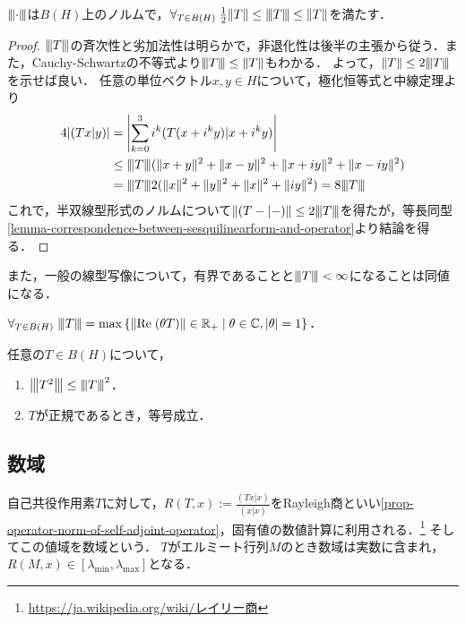 \documentclass[uplatex,dvipdfmx]{jsreport}
\begin{document}
\begin{proposition}[数域半径は同値なノルムを定める]
    $\nnorm{\cdot}$は$B(H)$上のノルムで，$\forall_{T\in B(H)}\;\frac{1}{2}\norm{T}\le\nnorm{T}\le\norm{T}$を満たす．
\end{proposition}
\begin{proof}
    $\nnorm{T}$の斉次性と劣加法性は明らかで，非退化性は後半の主張から従う．また，Cauchy-Schwartzの不等式より$\nnorm{T}\le\norm{T}$もわかる．
    よって，$\norm{T}\le 2\nnorm{T}$を示せば良い．
    任意の単位ベクトル$x,y\in H$について，極化恒等式と中線定理より
    \begin{align*}
        4\abs{(Tx|y)}&=\Abs{\sum^3_{k=0}i^k(T(x+i^ky)|x+i^ky)}\\
        &\le\nnorm{T}(\norm{x+y}^2+\norm{x-y}^2+\norm{x+iy}^2+\norm{x-iy}^2)\\
        &=\nnorm{T}2(\norm{x}^2+\norm{y}^2+\norm{x}^2+\norm{iy}^2)=8\nnorm{T}
    \end{align*}
    これで，半双線型形式のノルムについて$\norm{(T-|-)}\le2\nnorm{T}$を得たが，等長同型\ref{lemma-correspondence-between-sesquilinearform-and-operator}より結論を得る．
\end{proof}
\begin{remarks}
    また，一般の線型写像について，有界であることと$\nnorm{T}<\infty$になることは同値になる．
\end{remarks}

\begin{proposition}
    $\forall_{T\in B(H)}\;\nnorm{T}=\max\Brace{\norm{\Re(\theta T)}\in\R_+\mid\theta\in\C,\abs{\theta}=1}$．
\end{proposition}

\begin{proposition}
    任意の$T\in B(H)$について，
    \begin{enumerate}
        \item $\nnorm{T^2}\le\nnorm{T}^2$．
        \item $T$が正規であるとき，等号成立．
    \end{enumerate}
\end{proposition}

\subsection{数域}

\begin{tcolorbox}[colframe=ForestGreen, colback=ForestGreen!10!white,breakable,colbacktitle=ForestGreen!40!white,coltitle=black,fonttitle=\bfseries\sffamily,
title=]
    自己共役作用素$T$に対して，$R(T,x):=\frac{(Tx|x)}{(x|x)}$をRayleigh商といい\ref{prop-operator-norm-of-self-adjoint-operator}，固有値の数値計算に利用される．\footnote{\url{https://ja.wikipedia.org/wiki/レイリー商}}
    そしてこの値域を数域という．
    $T$がエルミート行列$M$のとき数域は実数に含まれ，$R(M,x)\in[\lambda_\mathrm{min},\lambda_\mathrm{max}]$となる．
\end{tcolorbox}
\end{document}
